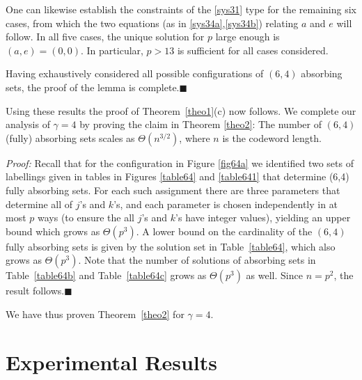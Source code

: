 One can likewise establish the constraints of the \eqref{sys31}
type for the remaining six cases, from which the two equations (as
in \eqref{sys34a},\eqref{sys34b}) relating $a$ and $e$ will
follow. In all five cases, the unique solution for $p$ large
enough is $(a,e)=(0,0)$. In particular, $p>13$ is sufficient for
all cases considered.



Having exhaustively considered  all possible configurations of
$(6,4)$ absorbing sets, the proof of the lemma is
complete.\hfill$\blacksquare$




Using these results the proof of Theorem~\ref{theo1}(c) now
follows.  We complete our analysis of
$\gamma=4$  by proving the claim in Theorem \ref{theo2}: The
number of $(6,4)$ (fully) absorbing sets scales as
$\Theta(n^{3/2})$, where $n$ is the
codeword length.%

\noindent \textit{Proof:} Recall that for the configuration in
Figure \ref{fig64a} we identified two sets of labellings given in
tables in Figures \ref{table64} and \ref{table641} that determine
(6,4) fully absorbing sets. For each such assignment there are
three parameters that determine all of $j$'s and $k$'s, and each
parameter is chosen independently in at most $p$ ways (to ensure
the all $j$'s and $k$'s have integer values), yielding an upper
bound which grows as $\Theta(p^3)$. A lower bound on the
cardinality of the $(6,4)$ fully absorbing sets is given by the
solution set in Table~\ref{table64}, which also grows as
$\Theta(p^3)$. Note that the number of solutions of absorbing sets
in Table~\ref{table64b} and Table~\ref{table64c} grows as
$\Theta(p^3)$ as well. Since $n=p^2$, the result
follows.\hfill$\blacksquare$

We have thus proven Theorem~\ref{theo2} for $\gamma=4$.

\section{Experimental Results}\label{expi}


